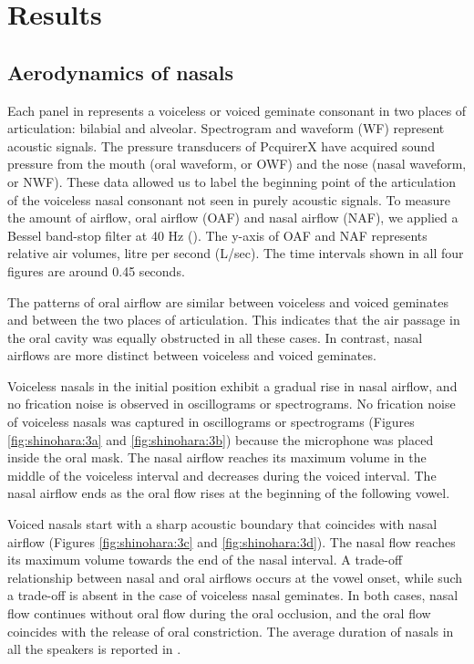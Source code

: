 \documentclass[output=paper]{langscibook}
\begin{document}
\section{Results}
\label{sec:shinohara:4}
\subsection{Aerodynamics of nasals}
\label{sec:shinohara:4.1}
Each panel in  represents a voiceless or voiced geminate consonant in two places of articulation: bilabial and alveolar. Spectrogram and waveform (WF) represent acoustic signals. The pressure transducers of PcquirerX have acquired sound pressure from the mouth (oral waveform, or OWF) and the nose (nasal waveform, or NWF). These data allowed us to label the beginning point of the articulation of the voiceless nasal consonant not seen in purely acoustic signals. To measure the amount of airflow, oral airflow (OAF) and nasal airflow (NAF), we applied a Bessel band-stop filter at 40 Hz (). The y-axis of OAF and NAF represents relative air volumes, litre per second (L/sec). The time intervals shown in all four figures are around 0.45 seconds.

The patterns of oral airflow are similar between voiceless and voiced geminates and between the two places of articulation. This indicates that the air passage in the oral cavity was equally obstructed in all these cases. In contrast, nasal airflows are more distinct between voiceless and voiced geminates. 

Voiceless nasals in the initial position exhibit a gradual rise in nasal airflow, and no frication noise is observed in oscillograms or spectrograms. No frication noise of voiceless nasals was captured in oscillograms or spectrograms (Figures \ref{fig:shinohara:3a} and \ref{fig:shinohara:3b}) because the microphone was placed inside the oral mask. The nasal airflow reaches its maximum volume in the middle of the voiceless interval and decreases during the voiced interval. The nasal airflow ends as the oral flow rises at the beginning of the following vowel.

Voiced nasals start with a sharp acoustic boundary that coincides with nasal airflow (Figures \ref{fig:shinohara:3c} and \ref{fig:shinohara:3d}). The nasal flow reaches its maximum volume towards the end of the nasal interval. A trade-off relationship between nasal and oral airflows occurs at the vowel onset, while such a trade-off is absent in the case of voiceless nasal geminates. In both cases, nasal flow continues without oral flow during the oral occlusion, and the oral flow coincides with the release of oral constriction. The average duration of nasals in all the speakers is reported in .
\end{document}
